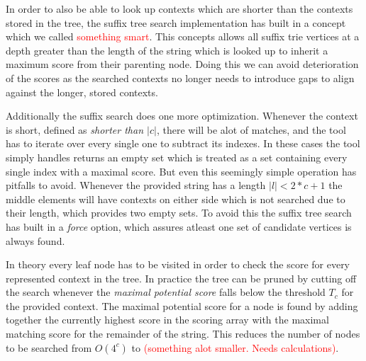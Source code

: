 \documentclass[thesis.tex]{subfiles}
\begin{document}
In order to also be able to look up contexts which are shorter than the contexts stored in the tree, the suffix tree search implementation has built in a concept which we called \textcolor{red}{something smart}. This concepts allows all suffix trie vertices at a depth greater than the length of the string which is looked up to inherit a maximum score from their parenting node. Doing this we can avoid deterioration of the scores as the searched contexts no longer needs to introduce gaps to align against the longer, stored contexts.
\par\noindent
Additionally the suffix search does one more optimization. Whenever the context is short, defined as \textit{shorter than $|c|$}, there will be alot of matches, and the tool has to iterate over every single one to subtract its indexes. In these cases the tool simply handles returns an empty set which is treated as a set containing every single index with a maximal score. But even this seemingly simple operation has pitfalls to avoid. Whenever the provided string has a length $|l| < 2*c+1$ the middle elements will have contexts on either side which is not searched due to their length, which provides two empty sets. To avoid this the suffix tree search has built in a \textit{force} option, which assures atleast one set of candidate vertices is always found.\\
\par\noindent
In theory every leaf node has to be visited in order to check the score for every represented context in the tree. In practice the tree can be pruned by cutting off the search whenever the \textit{maximal potential score} falls below the threshold $T_c$ for the provided context. The maximal potential score for a node is found by adding together the currently highest score in the scoring array with the maximal matching score for the remainder of the string. This reduces the number of nodes to be searched from $O(4^c)$ to \textcolor{red}{(something alot smaller. Needs calculations)}.\\
\end{document}
